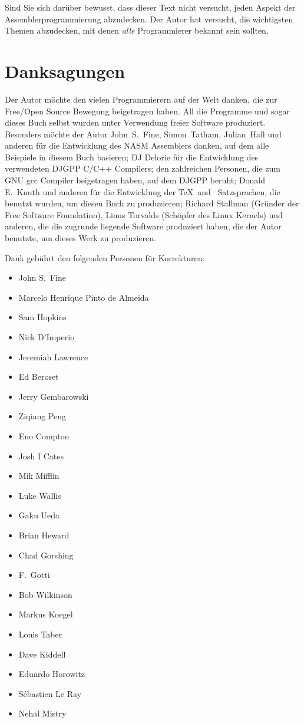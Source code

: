 Sind Sie sich dar\"{u}ber bewusst, dass dieser Text nicht versucht,
jeden Aspekt der Assemblerprogrammierung abzudecken. Der Autor hat
versucht, die wichtigsten Themen abzudecken, mit denen \emph{alle}
Programmierer bekannt sein sollten.

\section*{Danksagungen}

Der Autor m\"{o}chte den vielen Programmierern auf der Welt danken, die
zur Free/Open Source Bewegung beigetragen haben. All die Programme
und sogar dieses Buch selbst wurden unter Verwendung freier Software
produziert. Besonders m\"{o}chte der Autor John~S.~Fine, Simon~Tatham,
Julian~Hall und anderen f\"{u}r die Entwicklung des NASM Assemblers
danken, auf dem alle Beispiele in diesem Buch basieren; DJ Delorie
f\"{u}r die Entwicklung des verwendeten DJGPP C/C++ Compilers; den
zahlreichen Personen, die zum GNU gcc Compiler beigetragen haben,
auf dem DJGPP beruht; Donald E.\ Knuth und anderen f\"{u}r die
Entwicklung der \TeX\ and \LaTeXe\ Satzsprachen, die benutzt wurden,
um diesen Buch zu produzieren; Richard Stallman (Gr\"{u}nder der Free
Software Foundation), Linus Torvalds (Sch\"{o}pfer des Linux Kernels)
und anderen, die die zugrunde liegende Software produziert haben,
die der Autor benutzte, um dieses Werk zu produzieren.

Dank geb\"{u}hrt den folgenden Personen f\"{u}r Korrekturen:

\begin{itemize}
\parskip=-0.50em %
\item John S.\ Fine
\item Marcelo Henrique Pinto de Almeida
\item Sam Hopkins
\item Nick D'Imperio
\item Jeremiah Lawrence
\item Ed Beroset
\item Jerry Gembarowski
\item Ziqiang Peng
\item Eno Compton
\item Josh I Cates
\item Mik Mifflin
\item Luke Wallis
\item Gaku Ueda
\item Brian Heward
\item Chad Gorshing
\item F.\ Gotti
\item Bob Wilkinson
\item Markus Koegel
\item Louis Taber
\item Dave Kiddell
\item Eduardo Horowitz
\item S\'{e}bastien Le Ray
\item Nehal Mistry
\end{itemize}

